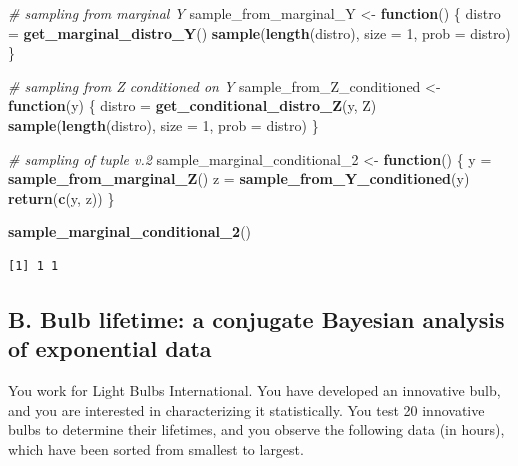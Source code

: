 \documentclass[
]{article}
\newenvironment{Shaded}{\begin{snugshade}}{\end{snugshade}}
\newcommand{\AttributeTok}[1]{\textcolor[rgb]{0.13,0.29,0.53}{#1}}
\newcommand{\CommentTok}[1]{\textcolor[rgb]{0.56,0.35,0.01}{\textit{#1}}}
\newcommand{\ControlFlowTok}[1]{\textcolor[rgb]{0.13,0.29,0.53}{\textbf{#1}}}
\newcommand{\DecValTok}[1]{\textcolor[rgb]{0.00,0.00,0.81}{#1}}
\newcommand{\FunctionTok}[1]{\textcolor[rgb]{0.13,0.29,0.53}{\textbf{#1}}}
\newcommand{\NormalTok}[1]{#1}
\newcommand{\OtherTok}[1]{\textcolor[rgb]{0.56,0.35,0.01}{#1}}
\begin{document}
\begin{Shaded}
\begin{Highlighting}[]
\CommentTok{\# sampling from marginal Y}
\NormalTok{sample\_from\_marginal\_Y }\OtherTok{\textless{}{-}} \ControlFlowTok{function}\NormalTok{() \{}
\NormalTok{    distro }\OtherTok{=} \FunctionTok{get\_marginal\_distro\_Y}\NormalTok{()}
    \FunctionTok{sample}\NormalTok{(}\FunctionTok{length}\NormalTok{(distro), }\AttributeTok{size =} \DecValTok{1}\NormalTok{, }\AttributeTok{prob =}\NormalTok{ distro)}
\NormalTok{\}}

\CommentTok{\# sampling from Z conditioned on Y}
\NormalTok{sample\_from\_Z\_conditioned }\OtherTok{\textless{}{-}} \ControlFlowTok{function}\NormalTok{(y) \{}
\NormalTok{    distro }\OtherTok{=} \FunctionTok{get\_conditional\_distro\_Z}\NormalTok{(y, Z)}
    \FunctionTok{sample}\NormalTok{(}\FunctionTok{length}\NormalTok{(distro), }\AttributeTok{size =} \DecValTok{1}\NormalTok{, }\AttributeTok{prob =}\NormalTok{ distro)}
\NormalTok{\}}

\CommentTok{\# sampling of tuple v.2}
\NormalTok{sample\_marginal\_conditional\_2 }\OtherTok{\textless{}{-}} \ControlFlowTok{function}\NormalTok{() \{}
\NormalTok{    y }\OtherTok{=} \FunctionTok{sample\_from\_marginal\_Z}\NormalTok{()}
\NormalTok{    z }\OtherTok{=} \FunctionTok{sample\_from\_Y\_conditioned}\NormalTok{(y)}
    \FunctionTok{return}\NormalTok{(}\FunctionTok{c}\NormalTok{(y, z))}
\NormalTok{\}}

\FunctionTok{sample\_marginal\_conditional\_2}\NormalTok{()}
\end{Highlighting}
\end{Shaded}

\begin{verbatim}
[1] 1 1
\end{verbatim}

\bigskip

\newpage

\hypertarget{b.-bulb-lifetime-a-conjugate-bayesian-analysis-of-exponential-data}{%
\subsection{B. Bulb lifetime: a conjugate Bayesian analysis of
exponential
data}\label{b.-bulb-lifetime-a-conjugate-bayesian-analysis-of-exponential-data}}

You work for Light Bulbs International. You have developed an innovative
bulb, and you are interested in characterizing it statistically. You
test 20 innovative bulbs to determine their lifetimes, and you observe
the following data (in hours), which have been sorted from smallest to
largest.
\end{document}
